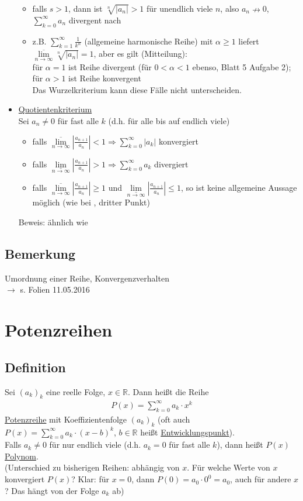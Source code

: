 \documentclass[12pt, titlepage]{article}
\newcommand{\R}{\mathds{R}}
\newcommand{\infn}{n\rightarrow\infty}
\renewcommand{\*}{\cdot}
\renewcommand{\limsup}[1]{\underset{#1}{\overline{\lim}}}
\renewcommand{\liminf}[1]{\underset{#1}{\underline{\lim}}}
\begin{document}
\begin{itemize}
\begin{itemize}
		\item falls $s>1$, dann ist $\sqrt[n]{|a_n|}>1$ für unendlich viele $n$, also $a_n\nrightarrow0$, $\sum_{k=0}^{\infty}a_n$ divergent nach 
		\item z.B. $\sum_{k=1}^{\infty}\frac{1}{k^\alpha}$ (allgemeine harmonische Reihe) mit $\alpha\geq1$ liefert $\limsup{\infn}\sqrt[n]{|a_n|}=1$, aber es gilt (Mitteilung):\\
		für $\alpha=1$ ist Reihe divergent (für $0<\alpha<1$ ebenso, Blatt 5 Aufgabe 2);\\
		für $\alpha>1$ ist Reihe konvergent\\
		Das Wurzelkriterium kann diese Fälle nicht unterscheiden.
	\end{itemize}
	\item[\fbox{6b}] \underline{Quotientenkriterium}\\
	Sei $a_n\neq0$ für fast alle $k$ (d.h. für alle bis auf endlich viele)
	\begin{itemize}
		\item falls $\limsup{\infn}|\frac{a_{n+1}}{a_n}|<1\Rightarrow\sum_{k=0}^{\infty}|a_k|$ konvergiert
		\item falls $\liminf{\infn}|\frac{a_{n+1}}{a_n}|>1\Rightarrow\sum_{k=0}^{\infty}a_k$ divergiert
		\item falls $\limsup{\infn}|\frac{a_{n+1}}{a_n}|\geq1$ und $\liminf{\infn}|\frac{a_{n+1}}{a_n}|\leq1$, so ist keine allgemeine Aussage möglich (wie bei , dritter Punkt)
	\end{itemize}
	Beweis: ähnlich wie 
 \end{itemize}%
 \subsection{Bemerkung}
 Umordnung einer Reihe, Konvergenzverhalten\\
 $\rightarrow$ s. Folien 11.05.2016
 \newpage
 \section{Potenzreihen}
 \subsection{Definition}
 Sei $(a_k)_k$ eine reelle Folge, $x\in\R$. Dann heißt die Reihe
 \begin{align*}
 	P(x)=\sum_{k=0}^{\infty}a_k\*x^k
 \end{align*}
 \underline{Potenzreihe} mit Koeffizientenfolge $(a_k)_k$ (oft auch $P(x)=\sum_{k=0}^{\infty}a_k\*(x-b)^k$, $b\in\R$ heißt \underline{Entwicklungspunkt}).\\
 Falls $a_k\neq0$ für nur endlich viele (d.h. $a_k=0$ für fast alle $k$), dann heißt $P(x)$ \underline{Polynom}.\\
 (Unterschied zu bisherigen Reihen: abhängig von $x$. Für welche Werte von $x$ konvergiert $P(x)$? Klar: für $x=0$, dann $P(0)=a_0\*0^0=a_0$, auch für andere $x$? Das hängt von der Folge $a_k$ ab)
\end{document}
